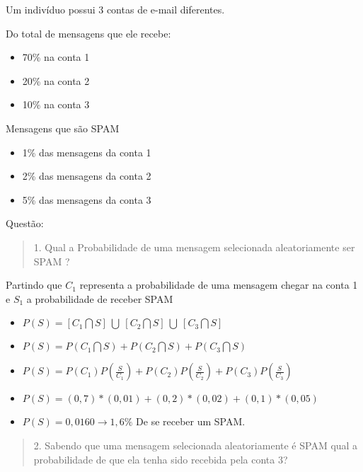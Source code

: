 \documentclass{article}
\begin{document}
    Um indivíduo possui 3 contas de e-mail diferentes. 
    \begin{multicols}{2}
      
    Do total de mensagens que ele recebe:
    
    \begin{itemize}
      \item 70\% na conta 1
      \item 20\% na conta 2
      \item 10\% na conta 3
    \end{itemize}

    Mensagens que são SPAM

    \begin{itemize}
      \item 1\% das  mensagens da conta 1 
      \item 2\% das  mensagens da conta 2
      \item 5\% das  mensagens da conta 3
    \end{itemize}
    \end{multicols}

    Questão:

    \begin{quote}
      1. Qual a Probabilidade de uma mensagem selecionada aleatoriamente ser SPAM ?
    \end{quote}
      
    Partindo que $ C_1 $ representa a probabilidade de uma mensagem chegar na conta 1 e $ S_1 $ a probabilidade de receber SPAM
    \begin{center}
    \begin{itemize}
      \item $ P(S) = [ C_1 \bigcap S ]\  \bigcup  \ [ C_2 \bigcap S ]\  \bigcup \ [ C_3 \bigcap S ]  $
      \item $ P(S) = P( C_1 \bigcap S ) + P( C_2 \bigcap S ) + P( C_3 \bigcap S )  $
      \item $ P(S) = P(C_1) P( \frac{S}{C_1} ) + P(C_2) P( \frac{S}{C_2} ) + P(C_3) P( \frac{S}{C_3} ) $
      \item $ P(S) = (0,7)*(0,01) + (0,2)*(0,02) + (0,1)*(0,05) $
      \item $ P(S) = 0,0160 \rightarrow 1,6\% $ De se receber um SPAM.
    \end{itemize}
    \end{center}

    \begin{quote}
      2. Sabendo que uma mensagem selecionada aleatoriamente é SPAM qual a probabilidade de que
      ela tenha sido recebida pela conta 3? 
    \end{quote}
\end{document}
